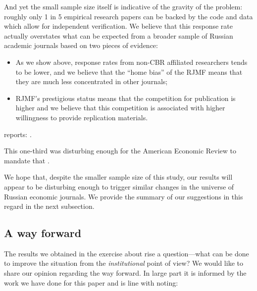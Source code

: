 \documentclass[12pt]{article}
\begin{document}
And yet the small sample size itself is indicative of the gravity of the problem: roughly only 1 in 5 empirical research papers can be backed by the code and data which allow for independent verification. We believe that this response rate actually overstates what can be expected from a broader sample of Russian academic journals based on two pieces of evidence:

\begin{itemize}
    \item As we show above, response rates from non-CBR affiliated researchers tends to be lower, and we believe that the ``home bias'' of the RJMF means that they are much less concentrated in other journals;
    \item RJMF's prestigious status means that the competition for publication is higher and we believe that this competition is associated with higher willingness to provide replication materials.
\end{itemize}

\cite{hamermesh2007replication} reports: .

This one-third was disturbing enough for the American Economic Review to mandate that .

We hope that, despite the smaller sample size of this study, our results will appear to be disturbing enough to trigger similar changes in the universe of Russian economic journals. We provide the summary of our suggestions in this regard in the next subsection.



\subsection{A way forward}

The results we obtained in the exercise about rise a question---what can be done to improve the situation from the {\it institutional} point of view? We would like to share our opinion regarding the way forward. In large part it is informed by the work we have done for this paper and is line with \cite{hamermesh2007replication} noting: 
\end{document}
